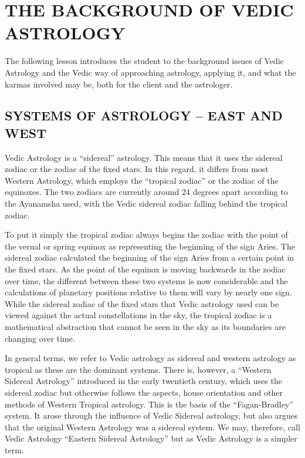 \section{THE BACKGROUND OF VEDIC ASTROLOGY}
 

The following lesson introduces the student to the background issues of Vedic Astrology and the Vedic way of approaching astrology, applying it, and what the karmas involved may be, both for the client and the astrologer.

 

\subsection{SYSTEMS OF ASTROLOGY – EAST AND WEST}
 

Vedic Astrology is a “sidereal” astrology. This means that it uses the sidereal zodiac or the zodiac of the fixed stars. In this regard, it differs from most Western Astrology, which employs the “tropical zodiac” or the zodiac of the equinoxes. The two zodiacs are currently around 24 degrees apart according to the Ayanamsha used, with the Vedic sidereal zodiac falling behind the tropical zodiac.

 

To put it simply the tropical zodiac always begins the zodiac with the point of the vernal or spring equinox as representing the beginning of the sign Aries. The sidereal zodiac calculated the beginning of the sign Aries from a  certain point in the fixed stars. As the point of the equinox is moving backwards in the zodiac over time, the different between these two systems is now considerable and the calculations of planetary positions relative to them will vary by nearly one sign. While the sidereal zodiac of the fixed stars that Vedic astrology used can be viewed against the actual constellations in the sky, the tropical zodiac is a mathematical abstraction that cannot be seen in the sky as its boundaries are changing over time.

 

In general terms, we refer to Vedic astrology as sidereal and western astrology as tropical as these are the dominant systems. There is, however, a “Western Sidereal Astrology” introduced in the early twentieth century, which uses the sidereal zodiac but otherwise follows the aspects, house orientation and other methods of Western Tropical astrology. This is the basis of the “Fagan-Bradley” system. It arose through the influence of Vedic Sidereal astrolo­gy, but also argues that the original Western Astrology was a sidereal system. We may, therefore, call Vedic Astrology “Eastern Sidereal Astrology” but as Vedic Astrology is a simpler term.

